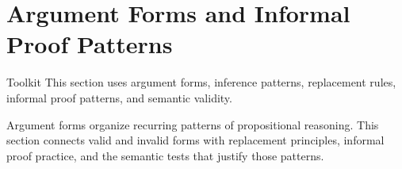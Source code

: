 \section{Argument Forms and Informal Proof Patterns}

\begin{toolkitbox}{Toolkit}
This section uses argument forms, inference patterns, replacement rules,
informal proof patterns, and semantic validity.
\end{toolkitbox}

\begin{remark*}[Exposition]
Argument forms organize recurring patterns of propositional reasoning. This
section connects valid and invalid forms with replacement principles, informal
proof practice, and the semantic tests that justify those patterns.
\end{remark*}










